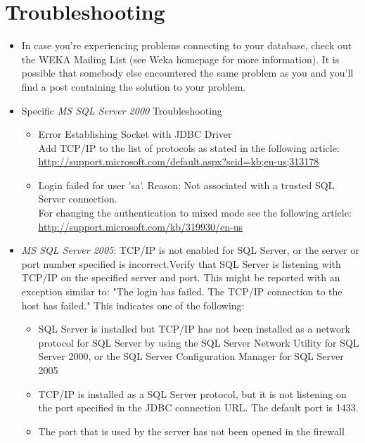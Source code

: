 \section{Troubleshooting}
\begin{itemize}
	\item In case you're experiencing problems connecting to your database, check out the WEKA Mailing List (see Weka homepage for more information). It is possible that somebody else encountered the same problem as you and you'll find a post containing the solution to your problem.

	\item Specific \textit{MS SQL Server 2000} Troubleshooting
	\begin{itemize}
		\item Error Establishing Socket with JDBC Driver \\
		Add TCP/IP to the list of protocols as stated in the following article: \\ \url{http://support.microsoft.com/default.aspx?scid=kb;en-us;313178}{}
		\item Login failed for user 'sa'. Reason: Not associated with a trusted SQL Server connection. \\
		For changing the authentication to mixed mode see the following article: \\
		\url{http://support.microsoft.com/kb/319930/en-us}{}
	\end{itemize}

	\item \textit{MS SQL Server 2005}: TCP/IP is not enabled for SQL Server, or the server or port number specified is incorrect.Verify that SQL Server is listening with TCP/IP on the specified server and port. This might be reported with an exception similar to: "The login has failed. The TCP/IP connection to the host has failed." This indicates one of the following:
	\begin{itemize}
		\item SQL Server is installed but TCP/IP has not been installed as a network protocol for SQL Server by using the SQL Server Network Utility for SQL Server 2000, or the SQL Server Configuration Manager for SQL Server 2005
		\item TCP/IP is installed as a SQL Server protocol, but it is not listening on the port specified in the JDBC connection URL. The default port is 1433.
		\item The port that is used by the server has not been opened in the firewall
	\end{itemize}


\end{itemize}
